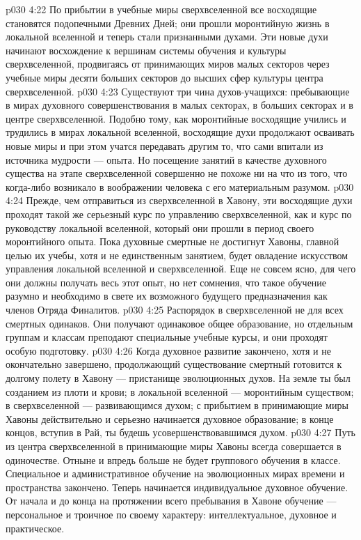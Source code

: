 \vs p030 4:22 \bibnobreakspace {} По прибытии в учебные миры сверхвселенной все восходящие становятся подопечными Древних Дней; они прошли моронтийную жизнь в локальной вселенной и теперь стали признанными духами. Эти новые духи начинают восхождение к вершинам системы обучения и культуры сверхвселенной, продвигаясь от принимающих миров малых секторов через учебные миры десяти больших секторов до высших сфер культуры центра сверхвселенной.
\vs p030 4:23 Существуют три чина духов\hyp{}учащихся: пребывающие в мирах духовного совершенствования в малых секторах, в больших секторах и в центре сверхвселенной. Подобно тому, как моронтийные восходящие учились и трудились в мирах локальной вселенной, восходящие духи продолжают осваивать новые миры и при этом учатся передавать другим то, что сами впитали из источника мудрости --- опыта. Но посещение занятий в качестве духовного существа на этапе сверхвселенной совершенно не похоже ни на что из того, что когда\hyp{}либо возникало в воображении человека с его материальным разумом.
\vs p030 4:24 Прежде, чем отправиться из сверхвселенной в Хавону, эти восходящие духи проходят такой же серьезный курс по управлению сверхвселенной, как и курс по руководству локальной вселенной, который они прошли в период своего моронтийного опыта. Пока духовные смертные не достигнут Хавоны, главной целью их учебы, хотя и не единственным занятием, будет овладение искусством управления локальной вселенной и сверхвселенной. Еще не совсем ясно, для чего они должны получать весь этот опыт, но нет сомнения, что такое обучение разумно и необходимо в свете их возможного будущего предназначения как членов Отряда Финалитов.
\vs p030 4:25 Распорядок в сверхвселенной не для всех смертных одинаков. Они получают одинаковое общее образование, но отдельным группам и классам преподают специальные учебные курсы, и они проходят особую подготовку.
\vs p030 4:26 \bibnobreakspace {} Когда духовное развитие закончено, хотя и не окончательно завершено, продолжающий существование смертный готовится к долгому полету в Хавону --- пристанище эволюционных духов. На земле ты был созданием из плоти и крови; в локальной вселенной --- моронтийным существом; в сверхвселенной --- развивающимся духом; с прибытием в принимающие миры Хавоны действительно и серьезно начинается духовное образование; в конце концов, вступив в Рай, ты будешь усовершенствовавшимся духом.
\vs p030 4:27 Путь из центра сверхвселенной в принимающие миры Хавоны всегда совершается в одиночестве. Отныне и впредь больше не будет группового обучения в классе. Специальное и административное обучение на эволюционных мирах времени и пространства закончено. Теперь начинается  индивидуальное духовное обучение. От начала и до конца на протяжении всего пребывания в Хавоне обучение --- персональное и троичное по своему характеру: интеллектуальное, духовное и практическое.
